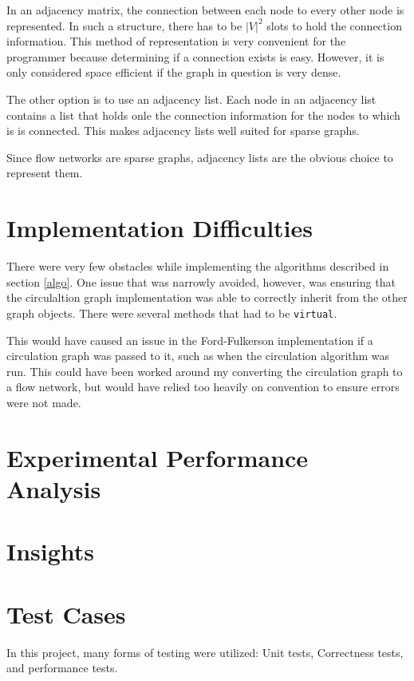 \documentclass[conference]{IEEEtran}
\begin{document}
In an adjacency matrix, the connection between each node to every other node is represented.
In such a structure, there has to be $|V|^2$ slots to hold the connection information. This
method of representation is very convenient for the programmer because determining if a 
connection exists is easy. However, it is only considered space efficient if the graph in
question is very dense. 

The other option is to use an adjacency list. Each node in an adjacency list contains a list 
that holds onle the connection information for the nodes to which is is connected. This makes 
adjacency lists well suited for sparse graphs. 

Since flow networks are sparse graphs, adjacency lists are the obvious choice to represent them.

\section{Implementation Difficulties} %
There were very few obstacles while implementing the algorithms described in section 
\ref{algo}. One issue that was narrowly avoided, however, was ensuring that the circulaltion
graph implementation was able to correctly inherit from the other graph objects. There
were several methods that had to be \lstinline{virtual}. 

This would have caused an issue in the Ford-Fulkerson implementation if a circulation graph
was passed to it, such as when the circulation algorithm was run. This could have been 
worked around my converting the circulation graph to a flow network, but would have relied
too heavily on convention to ensure errors were not made.


\section{Experimental Performance Analysis}

\section{Insights}

\section{Test Cases} %
In this project, many forms of testing were utilized: Unit tests, Correctness tests,
and performance tests.
\end{document}
